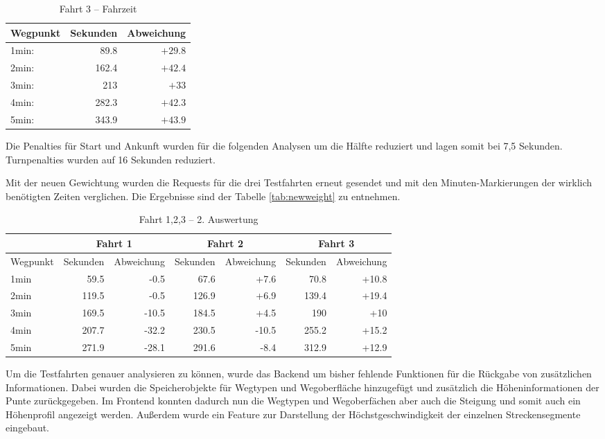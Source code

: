 \documentclass[12pt,a4paper]{article}
\begin{document}
\begin{table}[]
\centering
\caption{Fahrt 3 -- Fahrzeit}
\label{tab:drive3}
\begin{tabular}{|l|r|r|}
\hline
Wegpunkt & Sekunden & Abweichung \\ \hline 
1min: &  89.8 & $+29.8$ \\
2min: &  162.4 & $+42.4$ \\
3min: &  213 & $+33$ \\
4min: &  282.3 & $+42.3$ \\
5min: &  343.9 & $+43.9$ \\
\hline
\end{tabular}
\end{table}

Die Penalties für Start und Ankunft wurden für die folgenden Analysen um die Hälfte reduziert und lagen somit bei 7,5 Sekunden. Turnpenalties wurden auf 16 Sekunden reduziert. 

Mit der neuen Gewichtung wurden die Requests für die drei Testfahrten erneut gesendet und mit den Minuten-Markierungen der wirklich benötigten Zeiten verglichen.
Die Ergebnisse sind der Tabelle \ref{tab:newweight} zu entnehmen.

\begin{table}[]
\centering
\caption{Fahrt 1,2,3 -- 2. Auswertung}
\label{tab:all}
\begin{tabular}{|l|r|r|r|r|r|r|}
\hline
\multicolumn{1}{l}{} & \multicolumn{2}{c}{Fahrt 1} & \multicolumn{2}{c}{Fahrt 2} & \multicolumn{2}{c}{Fahrt 3} \\ \hline
Wegpunkt & Sekunden & Abweichung & Sekunden & Abweichung & Sekunden & Abweichung \\ \hline 
1min & 59.5 & -0.5 & 67.6 & +7.6 & 70.8 & +10.8  \\
2min & 119.5 & -0.5 & 126.9 & +6.9 & 139.4 & +19.4  \\
3min & 169.5 & -10.5 & 184.5 & +4.5 & 190 & +10  \\
4min & 207.7 & -32.2 & 230.5 & -10.5 & 255.2 & +15.2  \\
5min & 271.9 & -28.1 &  291.6 & -8.4 & 312.9 & +12.9   \\
\hline
\end{tabular}
\end{table}


Um die Testfahrten genauer analysieren zu können, wurde das Backend um bisher fehlende Funktionen für die Rückgabe von zusätzlichen Informationen. Dabei wurden die Speicherobjekte für Wegtypen und Wegoberfläche hinzugefügt und zusätzlich die Höheninformationen der Punte zurückgegeben. Im Frontend konnten dadurch nun die Wegtypen und Wegoberfächen aber auch die Steigung und somit auch ein Höhenprofil angezeigt werden. Außerdem wurde ein Feature zur Darstellung der Höchstgeschwindigkeit der einzelnen Streckensegmente eingebaut. 
\end{document}
